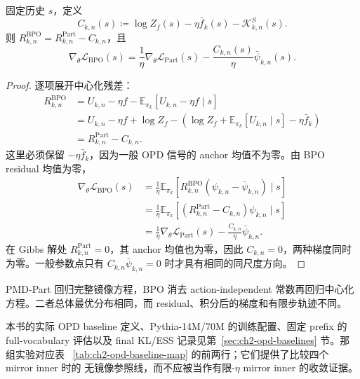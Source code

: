 \begin{proposition}
\label{prop:ch2-bpo-part-gradient-gap}
固定历史 $s$，定义
\begin{equation}
C_{k,n}(s)\coloneqq\log Z_f(s)-\eta\bar f_k(s)-\mathcal K_{k,n}^{S}(s).
\label{eq:ch2-bpo-part-qc}
\end{equation}
则 $R_{k,n}^{\mathrm{BPO}}=R_{k,n}^{\mathrm{Part}}-C_{k,n}$，且
\begin{equation}
\nabla_\theta\mathcal L_{\mathrm{BPO}}(s)
=\frac1\eta\nabla_\theta\mathcal L_{\mathrm{Part}}(s)
-\frac{C_{k,n}(s)}\eta\bar\psi_{k,n}(s).
\label{eq:ch2-bpo-part-gradient-gap}
\end{equation}
\end{proposition}
\begin{proof}
逐项展开中心化残差：
\begin{align*}
R_{k,n}^{\mathrm{BPO}}
&=U_{k,n}-\eta f-\mathbb E_{\pi_k}[U_{k,n}-\eta f\mid s]\\
&=U_{k,n}-\eta f+\log Z_f
-\left(\log Z_f+\mathbb E_{\pi_k}[U_{k,n}\mid s]-\eta\bar f_k\right)\\
&=R_{k,n}^{\mathrm{Part}}-C_{k,n}.
\end{align*}
这里必须保留 $-\eta\bar f_k$，因为一般 OPD 信号的 anchor 均值不为零。由 BPO residual 均值为零，
\begin{align*}
\nabla_\theta\mathcal L_{\mathrm{BPO}}(s)
&=\frac1\eta\mathbb E_{\pi_k}[R_{k,n}^{\mathrm{BPO}}(\psi_{k,n}-\bar\psi_{k,n})\mid s]\\
&=\frac1\eta\mathbb E_{\pi_k}[(R_{k,n}^{\mathrm{Part}}-C_{k,n})\psi_{k,n}\mid s]\\
&=\frac1\eta\nabla_\theta\mathcal L_{\mathrm{Part}}(s)-\frac{C_{k,n}}\eta\bar\psi_{k,n}.
\end{align*}
在 Gibbs 解处 $R_{k,n}^{\mathrm{Part}}=0$，其 anchor 均值也为零，因此 $C_{k,n}=0$，两种梯度同时为零。一般参数点只有 $C_{k,n}\bar\psi_{k,n}=0$ 时才具有相同的同尺度方向。
\end{proof}

PMD-Part 回归完整镜像方程，BPO 消去 action-independent 常数再回归中心化方程。二者总体最优分布相同，而 residual、积分后的梯度和有限步轨迹不同。

本书的实际 OPD baseline 定义、Pythia-14M/70M 的训练配置、固定 prefix 的 full-vocabulary
评估以及 final KL/ESS 记录见第~\ref{sec:ch2-opd-baselines} 节。那组实验对应表
~\ref{tab:ch2-opd-baseline-map} 的前两行；它们提供了比较四个 mirror inner 时的
无镜像参照线，而不应被当作有限-$\eta$ mirror inner 的收敛证据。

